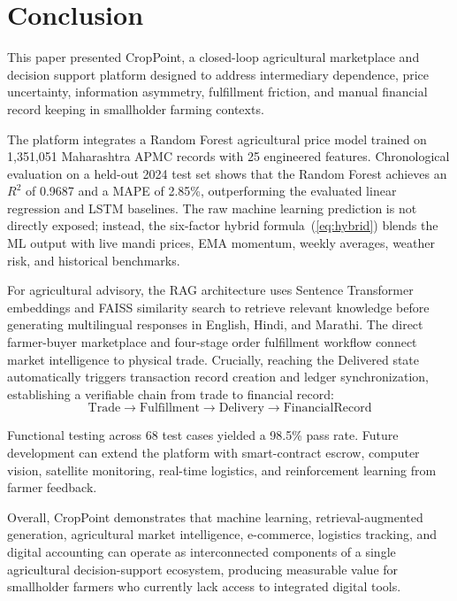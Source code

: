 \documentclass[conference]{IEEEtran}
\begin{document}
\section{Conclusion}

This paper presented CropPoint, a closed-loop agricultural
marketplace and decision support platform designed to address
intermediary dependence, price uncertainty, information asymmetry,
fulfillment friction, and manual financial record keeping in
smallholder farming contexts.

The platform integrates a Random Forest agricultural price model
trained on 1,351,051 Maharashtra APMC records with 25 engineered
features. Chronological evaluation on a held-out 2024 test set
shows that the Random Forest achieves an $R^2$ of 0.9687 and a
MAPE of 2.85\%, outperforming the evaluated linear regression and
LSTM baselines. The raw machine learning prediction is not directly
exposed; instead, the six-factor hybrid formula~(\ref{eq:hybrid})
blends the ML output with live mandi prices, EMA momentum, weekly
averages, weather risk, and historical benchmarks.

For agricultural advisory, the RAG architecture uses Sentence
Transformer embeddings and FAISS similarity search to retrieve
relevant knowledge before generating multilingual responses in
English, Hindi, and Marathi. The direct farmer-buyer marketplace
and four-stage order fulfillment workflow connect market intelligence
to physical trade. Crucially, reaching the Delivered state
automatically triggers transaction record creation and ledger
synchronization, establishing a verifiable chain from trade to
financial record:
\begin{equation}
\mathrm{Trade}
\rightarrow \mathrm{Fulfillment}
\rightarrow \mathrm{Delivery}
\rightarrow \mathrm{FinancialRecord}
\end{equation}

Functional testing across 68 test cases yielded a 98.5\% pass rate.
Future development can extend the platform with smart-contract
escrow, computer vision, satellite monitoring, real-time logistics,
and reinforcement learning from farmer feedback.

Overall, CropPoint demonstrates that machine learning,
retrieval-augmented generation, agricultural market intelligence,
e-commerce, logistics tracking, and digital accounting can operate
as interconnected components of a single agricultural
decision-support ecosystem, producing measurable value for
smallholder farmers who currently lack access to integrated
digital tools.
\end{document}
